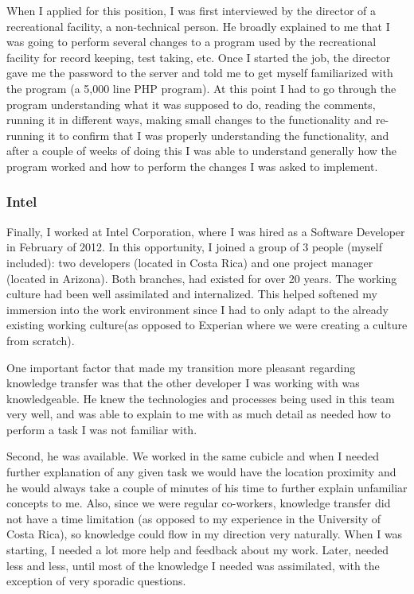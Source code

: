 \documentclass[12pt, letterpaper]{article}
\begin{document}
When I applied for this position, I was first interviewed by the director of a recreational facility, 
a non-technical person. He broadly explained to me that I was going to 
perform several changes to a program used by the recreational facility for record keeping,
test taking, etc. Once I started the job, the director gave me the password to the server and told me to 
get myself familiarized with the program (a 5,000 line PHP program). At this point I had to go through
the program understanding what it was supposed to do, reading the comments, running it in different ways, making small 
changes to the 
functionality and re-running it to confirm that I was properly understanding the functionality, and after a couple of 
weeks of doing this I was able to understand generally how the program worked and how to perform the changes I was asked
to implement.

\subsubsection{Intel}
Finally, I worked at Intel Corporation, where I was hired
as a Software Developer in February of 2012. In this opportunity, I joined a group of 3 people (myself included):
two developers (located in Costa Rica) and one project manager (located in Arizona). Both branches, 
had existed for over 20 years. The working culture had been well assimilated and internalized. 
This helped softened my immersion into the work environment since I had to only adapt to the already
existing working culture(as opposed to Experian where we were creating a culture from scratch).

One important factor that made my transition more pleasant regarding knowledge transfer was that 
the other developer I was working with was knowledgeable. He knew the technologies and processes
being used in this team very well, and was able to explain to me with as much detail as 
needed how to perform a task I was not familiar with. 

Second, he was available. We worked in the same cubicle and when I needed further explanation of any given 
task we would have the location proximity and he would always take a couple of minutes of his time
to further explain unfamiliar concepts to me. Also, since we were regular co-workers, knowledge transfer did not have a
time limitation (as opposed to my experience in the University of Costa Rica), so knowledge could flow in my
direction very naturally. When I was starting, I needed a lot more help and feedback about my work. 
Later, needed less and less, 
until most of the knowledge I needed was assimilated, with the exception of very sporadic questions. 
\end{document}
